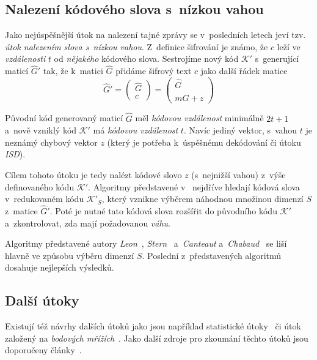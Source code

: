 \documentclass[thesis=M,czech,hidelinks]{FITthesis}[2012/06/26]
\newcommand{\0}{{\textcolor[gray]{0.75}{0}}}
\begin{document}
\subsection{Nalezení kódového slova s~nízkou vahou}

Jako nejúspěšnější útok na nalezení tajné zprávy se v~posledních letech jeví
tzv. \emph{útok nalezením slova s~nízkou vahou}. Z~definice šifrování je známo,
že $c$ leží ve \emph{vzdálenosti} $t$ od \emph{nějakého} kódového slova.
Sestrojíme nový kód $\mathcal{K}'$ s~generující maticí $\hat{G}'$ tak, že
k~matici $\hat{G}$ přidáme šifrový text $c$ jako další řádek matice
$$
    \hat{G}' = \left(\begin{array}{c}
        \hat{G} \\
        c
    \end{array}\right) = \left(\begin{array}{c}
        \hat{G} \\
        m\hat{G} + z
    \end{array}\right)
$$

Původní kód generovaný maticí $\hat{G}$ měl \emph{kódovou vzdálenost} minimálně
$2t+1$ a~nově vzniklý kód $\mathcal{K}'$ má \emph{kódovou vzdálenost} $t$. Navíc
jediný vektor, s~vahou $t$ je neznámý chybový vektor $z$ (který je potřeba
k~úspěšnému dekódování či útoku \emph{ISD}).

Cílem tohoto útoku je tedy nalézt kódové slovo $z$ (s~nejnižší vahou) z~výše
definovaného kódu $\mathcal{K}'$. Algoritmy představené
v~\cite{Leon,Stern,Canteaut} nejdříve hledají kódová slova v~redukovaném kódu
$\mathcal{K}'_S$, který vznikne výběrem náhodnou množinou dimenzí $S$ z~matice
$\hat{G}'$. Poté je nutné tato kódová slova rozšířit do původního kódu
$\mathcal{K}'$ a~zkontrolovat, zda mají požadovanou \emph{váhu}.


Algoritmy představené autory \emph{Leon}~\cite{Leon}, \emph{Stern}~\cite{Stern}
a~\emph{Canteaut} a~\emph{Chabaud}~\cite{Canteaut} se liší hlavně ve způsobu
výběru dimenzí $S$. Poslední z~představených algoritmů dosahuje nejlepších
výsledků.


\subsection{Další útoky}

Existují též návrhy dalších útoků jako jsou například statistické
útoky~\cite{Jabri} či útok založený na \emph{bodových mřížích}~\cite{Brickell}.
Jako další zdroje pro zkoumání těchto útoků jsou doporučeny
články~\cite{Repka,Engelbert}.
\end{document}
